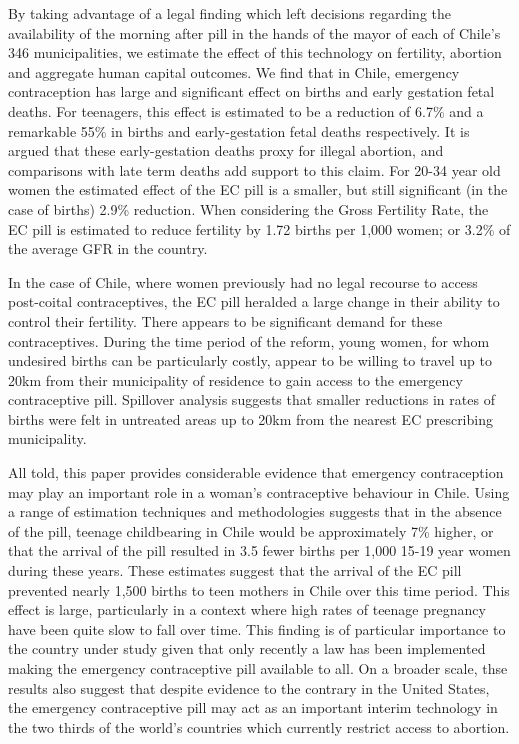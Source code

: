 By taking advantage of a legal finding which left decisions regarding the 
availability of the morning after pill in the hands of the mayor of each of
Chile's 346 municipalities, we estimate the effect of this technology on 
fertility, abortion and aggregate human capital outcomes. We find that in Chile,
emergency contraception has large and significant effect on births and early 
gestation fetal deaths.  For teenagers, this effect is estimated to be a
reduction of 6.7\% and a remarkable 55\% in births and early-gestation fetal 
deaths respectively.  It is argued that these early-gestation deaths proxy for
illegal abortion, and comparisons with late term deaths add support to this
claim. For 20-34 year old women the estimated effect of the EC pill is a
smaller, but still significant (in the case of births) 2.9\% reduction.  When
considering the Gross Fertility Rate, the EC pill is estimated to reduce
fertility by 1.72 births per 1,000 women; or 3.2\% of the average GFR in the
country.

In the case of Chile, where women previously had no legal recourse to access
post-coital contraceptives, the EC pill heralded a large change in their ability
to control their fertility.  There appears to be significant demand for these
contraceptives.  During the time period of the reform, young women, for whom
undesired births can be particularly costly, appear to be willing to travel up
to 20km from their municipality of residence to gain access to the emergency
contraceptive pill.  Spillover analysis suggests that smaller reductions in 
rates of births were felt in untreated areas up to 20km from the nearest EC
prescribing municipality.

All told, this paper provides considerable evidence that emergency contraception 
may play an important role in a woman's contraceptive behaviour in Chile.  Using
a range of estimation techniques and methodologies suggests that in the absence
of the pill, teenage childbearing in Chile would be approximately 7\% higher, or
that the arrival of the pill resulted in 3.5 fewer births per 1,000 15-19 year 
women during these years.  These estimates suggest that the arrival of the EC 
pill prevented nearly 1,500 births to teen mothers in Chile over this time 
period. This effect is large, particularly in a context where high rates of 
teenage pregnancy have been quite slow to fall over time. This finding is of 
particular importance to the country under study given that only recently a law
has been implemented making the emergency contraceptive pill available to all. On
a broader scale, thse results also suggest that despite evidence to the contrary
in the United States, the emergency contraceptive pill may act as an important
interim technology in the two thirds of the world's countries which currently
restrict access to abortion.


